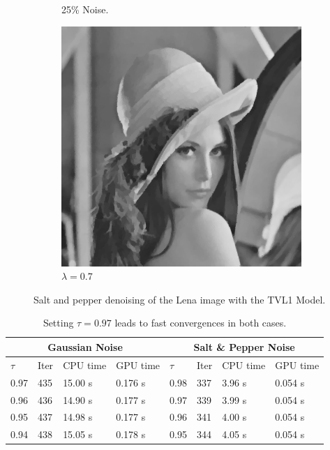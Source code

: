 \documentclass[abstracton]{scrreprt}
\begin{document}
\begin{figure}[!ht]
\begin{subfigure}[b]{0.31\textwidth}
                    \caption{25\% Noise.}
                \end{subfigure}
                \begin{subfigure}[b]{0.31\textwidth}
                    \includegraphics[width=\textwidth]{img/denoising/salt_and_pepper_noise/07lena.png}
                    \caption{$\lambda = 0.7$}
                \end{subfigure}
                \caption[Salt and pepper denoising example: TVL1.]{Salt and pepper denoising of the Lena image with the TVL1 Model.}
            \label{fig:denoising_lena_tvl1_sap}
            \end{figure}
            \begin{table}[!ht]
                \centering
                \begin{tabular}{| l | l | l | l | l | l | l | l |}
                    \hline
                    \multicolumn{4}{|c|}{Gaussian Noise} & \multicolumn{4}{|c|}{Salt \& Pepper Noise} \\ \hline\hline
                    $\tau$ & Iter & CPU time & GPU time & $\tau$ & Iter & CPU time & GPU time \\ \hline
                    0.97 & 435 & 15.00 s & 0.176 s & 0.98 & 337 & 3.96 s & 0.054 s \\ \hline
                    0.96 & 436 & 14.90 s & 0.177 s & 0.97 & 339 & 3.99 s & 0.054 s \\ \hline
                    0.95 & 437 & 14.98 s & 0.177 s & 0.96 & 341 & 4.00 s & 0.054 s \\ \hline
                    0.94 & 438 & 15.05 s & 0.178 s & 0.95 & 344 & 4.05 s & 0.054 s \\ \hline
                \end{tabular}
                \caption[Best estimate of $\tau$ for the TVL1 model for denoising.]{Setting $\tau = 0.97$ leads to fast convergences in both cases.}
                \label{tab:estimation_of_tau_denoising}
            \end{table}
\end{document}
